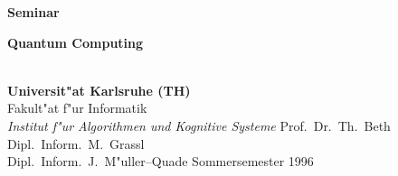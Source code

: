 \documentclass[twoside]{report}
\begin{document}
\begin{titlepage}\Large
\begin{center}
{\LARGE\bf Seminar} \\[1cm]
{\huge\bf Quantum Computing\par} 
\vspace*{1cm}
\\[1cm]
{\bf Universit"at Karlsruhe (TH)}\\
{Fakult"at f"ur Informatik}\\
{\em Institut f"ur Algorithmen und Kognitive Systeme}
\vfill
Prof.~Dr.~Th.~Beth\\
Dipl.~Inform.~M.~Grassl\\
Dipl.~Inform.~J.~M"uller--Quade
\vfill\vfill 
Sommersemester 1996
\vfill
\vfill
\end{center}
\end{titlepage} 
 
\newpage
\thispagestyle{empty}
\ 
\newpage 

\tableofcontents
\cleardoublepage
{}

\end{document}
